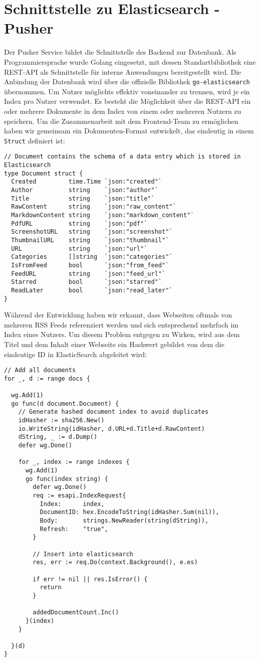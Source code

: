 \section{Schnittstelle zu Elasticsearch - Pusher}
Der Pusher Service bildet die Schnittstelle des Backend zur Datenbank.
Als Programmiersprache wurde Golang \cite{go} eingesetzt, mit dessen Standartbibliothek eine REST-API als Schnittstelle für interne Anwendungen bereitgestellt wird.
Die Anbindung der Datenbank wird über die offizielle Bibliothek \texttt{go-elasticsearch}\cite{goes} übernommen.
Um Nutzer möglichts effektiv voneinander zu trennen, wird je ein Index pro Nutzer verwendet.
Es besteht die Möglichkeit über die REST-API ein oder mehrere Dokumente in dem Index von einem oder mehreren Nutzern zu speichern.
Um die Zusammenarbeit mit dem Frontend-Team zu ermöglichen haben wir gemeinsam ein Dokumenten-Format entwickelt, das eindeutig in einem \texttt{Struct} definiert ist:
\begin{verbatim}
// Document contains the schema of a data entry which is stored in Elasticsearch
type Document struct {
  Created         time.Time `json:"created"`
  Author          string    `json:"author"`
  Title           string    `json:"title"`
  RawContent      string    `json:"raw_content"`
  MarkdownContent string    `json:"markdown_content"`
  PdfURL          string    `json:"pdf"`
  ScreenshotURL   string    `json:"screenshot"`
  ThumbnailURL    string    `json:"thumbnail"`
  URL             string    `json:"url"`
  Categories      []string  `json:"categories"`
  IsFromFeed      bool      `json:"from_feed"`
  FeedURL         string    `json:"feed_url"`
  Starred         bool      `json:"starred"`
  ReadLater       bool      `json:"read_later"`
}
\end{verbatim}
Während der Entwicklung haben wir erkannt, dass Webseiten oftmals von mehreren RSS Feeds referenziert werden und sich entsprechend mehrfach im Index eines Nutzers.
Um diesem Problem entgegen zu Wirken, wird aus dem Titel und dem Inhalt einer Webseite ein Hashwert gebildet von dem die eindeutige ID in ElasticSearch abgeleitet wird:
\begin{verbatim}
// Add all documents
for _, d := range docs {

  wg.Add(1)
  go func(d document.Document) {
    // Generate hashed document index to avoid duplicates
    idHasher := sha256.New()
    io.WriteString(idHasher, d.URL+d.Title+d.RawContent)
    dString, _ := d.Dump()
    defer wg.Done()

    for _, index := range indexes {
      wg.Add(1)
      go func(index string) {
        defer wg.Done()
        req := esapi.IndexRequest{
          Index:      index,
          DocumentID: hex.EncodeToString(idHasher.Sum(nil)),
          Body:       strings.NewReader(string(dString)),
          Refresh:    "true",
        }

        // Insert into elasticsearch
        res, err := req.Do(context.Background(), e.es)

        if err != nil || res.IsError() {
          return
        }

        addedDocumentCount.Inc()
      }(index)
    }

  }(d)
}
\end{verbatim}
